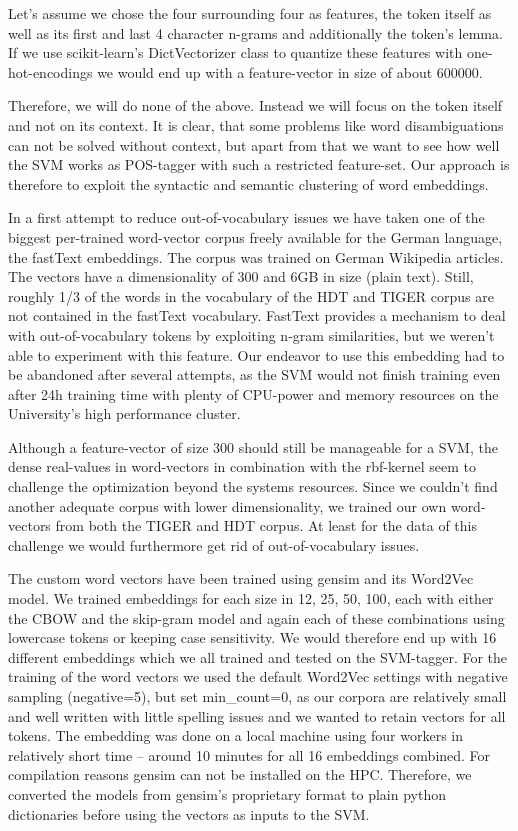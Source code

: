 \documentclass[11pt,a4paper]{article}
\begin{document}
Let's assume we chose the four surrounding four as features, the token itself as well as its first and last 4 character n-grams and additionally the token's lemma. If we use scikit-learn's DictVectorizer class to quantize these features with one-hot-encodings we would end up with a feature-vector in size of about $600000$.

Therefore, we will do none of the above. Instead we will focus on the token itself and not on its context. It is clear, that some problems like word disambiguations can not be solved without context, but apart from that we want to see how well the SVM works as POS-tagger with such a restricted feature-set. Our approach is therefore to exploit the syntactic and semantic clustering of word embeddings.

In a first attempt to reduce out-of-vocabulary issues we have taken one of the biggest per-trained word-vector corpus freely available for the German language, the fastText embeddings. The corpus was trained on German Wikipedia articles. The vectors have a dimensionality of 300  and 6GB in size (plain text). Still, roughly 1/3 of the words in the vocabulary of the HDT and TIGER corpus are not contained in the fastText vocabulary. FastText provides a mechanism to deal with out-of-vocabulary tokens by exploiting n-gram similarities, but we weren't able to experiment with this feature. Our endeavor to use this embedding had to be abandoned after several attempts, as the SVM would not finish training even after 24h training time with plenty of CPU-power and memory resources on the 
University's high performance cluster.

Although a feature-vector of size 300 should still be manageable for a SVM, the dense real-values in word-vectors in combination with the rbf-kernel seem to challenge the optimization beyond the systems resources. Since we couldn't find another adequate corpus with lower dimensionality, we trained our own word-vectors from both the TIGER and HDT corpus. At least for the data of this challenge we would furthermore get rid of out-of-vocabulary issues.

The custom word vectors have been trained using gensim and its Word2Vec model. We trained embeddings for each size in {12, 25, 50, 100}, each with either the CBOW and the skip-gram model and again each of these combinations using lowercase tokens or keeping case sensitivity. We would therefore end up with 16 different embeddings which we all trained and tested on the SVM-tagger. For the training of the word vectors we used the default Word2Vec settings with negative sampling (negative=5), but set min\_count=0, as our corpora are relatively small and well written with little spelling issues and we wanted to retain vectors for all tokens.
The embedding was done on a local machine using four workers in relatively short time -- around 10 minutes for all 16 embeddings combined. For compilation reasons gensim can not be installed on the HPC. Therefore, we converted the models from gensim's proprietary format to plain python dictionaries before using the vectors as inputs to the SVM.
\end{document}
